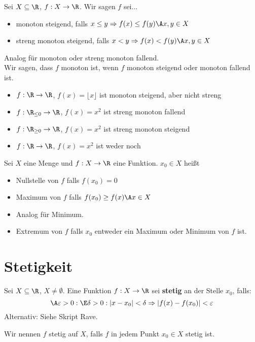 \documentclass[main.tex]{subfiles}
\begin{document}
\begin{Definition}[Monotonie]
  Sei $X \subseteq \R$, $f: X \to \R$. Wir sagen $f$ sei...
  \begin{itemize}
    \item monoton steigend, falls $x \leq y \Rightarrow f(x) \leq f(y) \A x,y \in X$
    \item streng monoton steigend, falls $x < y \Rightarrow f(x) < f(y) \A x,y \in X$
  \end{itemize}
  Analog für monoton oder streng monoton fallend.\\
  Wir sagen, dass $f$ monoton ist, wenn $f$ monoton steigend oder monoton fallend ist.
\end{Definition}

\begin{Beispiel}
  \begin{itemize}
    \item $f: \R \to \R$, $f(x) = \lfloor x \rfloor$ ist monoton steigend, aber nicht streng
    \item $f: \R_{\leq 0} \to \R$, $f(x) = x^2$ ist streng monoton fallend
    \item $f: \R_{\geq 0} \to \R$, $f(x) = x^2$ ist streng monoton steigend
    \item $f: \R \to \R$, $f(x) = x^2$ ist weder noch
  \end{itemize}
\end{Beispiel}

\begin{Definition}
  Sei $X$ eine Menge und $f: X \to \R$ eine Funktion. $x_0 \in X$ heißt
  \begin{itemize}
    \item Nullstelle von $f$ falls $f(x_0) = 0$
    \item Maximum von $f$ falls $f(x_0) \geq f(x) \A x \in X$
    \item Analog für Minimum.
    \item Extremum von $f$ falls $x_0$ entweder ein Maximum oder Minimum von $f$ ist.
  \end{itemize}
\end{Definition}


\section{Stetigkeit}

\begin{Definition}[Stetigkeit]
  Sei $X \subseteq \R$, $X \neq \emptyset$. Eine Funktion $f : X \to \R$ sei \textbf{stetig} an der Stelle $x_0$, falls:
  $$\A \varepsilon > 0 : \E \delta > 0 : |x - x_0| < \delta \Rightarrow |f(x)-f(x_0)| < \varepsilon $$
  Alternativ:
  Siehe Skript Rave.

  Wir nennen $f$ stetig auf $X$, falls $f$ in jedem Punkt $x_0 \in X$ stetig ist.
\end{Definition}
\end{document}
